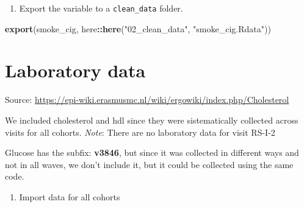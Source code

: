 \documentclass[]{book}
\newenvironment{Shaded}{\begin{snugshade}}{\end{snugshade}}
\newcommand{\KeywordTok}[1]{\textcolor[rgb]{0.13,0.29,0.53}{\textbf{#1}}}
\newcommand{\NormalTok}[1]{#1}
\newcommand{\OperatorTok}[1]{\textcolor[rgb]{0.81,0.36,0.00}{\textbf{#1}}}
\newcommand{\StringTok}[1]{\textcolor[rgb]{0.31,0.60,0.02}{#1}}
\providecommand{\tightlist}{%
  \setlength{\itemsep}{0pt}\setlength{\parskip}{0pt}}
\begin{document}
\begin{enumerate}
\def\labelenumi{\arabic{enumi}.}
\setcounter{enumi}{6}
\tightlist
\item
  Export the variable to a \texttt{clean\_data} folder.
\end{enumerate}

\begin{Shaded}
\begin{Highlighting}[]
\KeywordTok{export}\NormalTok{(smoke_cig, here}\OperatorTok{::}\KeywordTok{here}\NormalTok{(}\StringTok{"02_clean_data"}\NormalTok{, }\StringTok{"smoke_cig.Rdata"}\NormalTok{))}
\end{Highlighting}
\end{Shaded}

\hypertarget{lab}{%
\chapter{Laboratory data}\label{lab}}

Source: \url{https://epi-wiki.erasmusmc.nl/wiki/ergowiki/index.php/Cholesterol}

We included cholesterol and hdl since they were sistematically collected across visits for all cohorts.
\emph{Note}: There are no laboratory data for visit RS-I-2

Glucose has the subfix: \textbf{v3846}, but since it was collected in different ways and not in all waves, we don't include it, but it could be collected using the same code.

\begin{enumerate}
\def\labelenumi{\arabic{enumi}.}
\tightlist
\item
  Import data for all cohorts
\end{enumerate}
\end{document}
